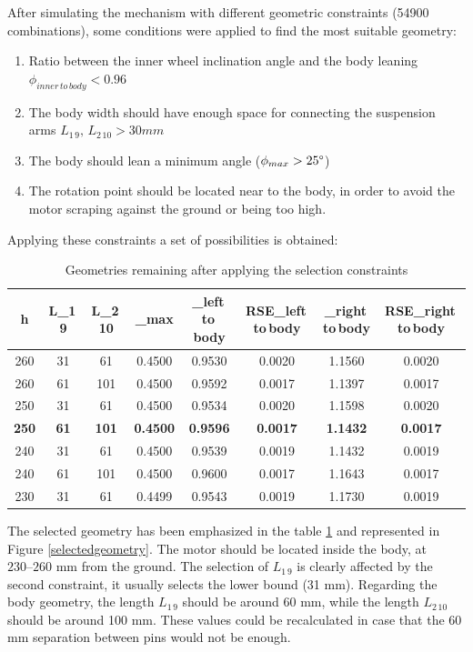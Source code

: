 After simulating the mechanism with different geometric constraints (54900 combinations), some conditions were applied to find the most suitable geometry:
\begin{enumerate}\itemsep -8pt
 \item Ratio between the inner wheel inclination angle and the body leaning \textbf{$\phi_{inner\,to\,body}< 0.96$}
 \item The body width should have enough space for connecting the suspension arms \textbf{$L_{1\,9},\,L_{2\,10} > 30 mm$}
 \item The body should lean a minimum angle ($\phi_{max}>25\degree$)
 \item The rotation point should be located near to the body, in order to avoid the motor scraping against the ground or being too high.
\end{enumerate}
Applying these constraints a set of possibilities is obtained: 
\begin{table}[h!]
\centering
\begin{tabular}{ccc|ccccc}
	\\[20pt]
	h   & L_{1\,9} & L_{2\,10} & \phi_{max} & \phi_{left\,to\,body} & RSE_{left\,to\,body} & \phi_{right\,to\,body} & RSE_{right\,to\,body} \\ \hline
	260 & 31    & 61  & 0.4500   & 0.9530  & 0.0020  & 1.1560  & 0.0020\\
	260 & 61    & 101  & 0.4500   & 0.9592  & 0.0017 & 1.1397  & 0.0017\\
	250 & 31    & 61   & 0.4500   & 0.9534  & 0.0020 & 1.1598  & 0.0020\\
	\textbf{250} & \textbf{61}    & \textbf{101}  & \textbf{0.4500}   & \textbf{0.9596}  & \textbf{0.0017} & \textbf{1.1432}  & \textbf{0.0017}\\
	240 & 31    & 61   & 0.4500   & 0.9539  & 0.0019 & 1.1432  & 0.0019\\
	240 & 61    & 101  & 0.4500   & 0.9600  & 0.0017 & 1.1643  & 0.0017\\
	230 & 31    & 61   & 0.4499   & 0.9543  & 0.0019 & 1.1730  & 0.0019\\ \hline  
	\end{tabular}
	\caption{Geometries remaining after applying the selection constraints}
	\label{selection}
\end{table}

\newpage
The selected geometry has been emphasized in the table \ref{selection} and represented in Figure \ref{selectedgeometry}. The motor should be located inside the body, at $230–260$ mm from the ground. The selection of $L_{1\,9}$ is clearly affected by the second constraint, it usually selects the lower bound (31 mm). Regarding the body geometry, the length $L_{1\,9}$ should be around 60 mm, while the length $L_{2\,10}$ should be around 100 mm. These values could be recalculated in case that the 60 mm separation between pins would not be enough. 


